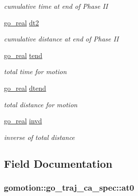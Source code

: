 \begin{DoxyCompactItemize}
\begin{DoxyCompactList}\small\item\em cumulative time at end of Phase I\-I \end{DoxyCompactList}\item 
\hyperlink{gotypes_8h_afd666a2393eebd71ee455846ac9def9b}{go\-\_\-real} \hyperlink{structgomotion_1_1go__traj__ca__spec_a8c0af79f001dc34f84c85968548c3b9b}{dt2}
\begin{DoxyCompactList}\small\item\em cumulative distance at end of Phase I\-I \end{DoxyCompactList}\item 
\hyperlink{gotypes_8h_afd666a2393eebd71ee455846ac9def9b}{go\-\_\-real} \hyperlink{structgomotion_1_1go__traj__ca__spec_abcb5b78e929e0b33d940518032271d04}{tend}
\begin{DoxyCompactList}\small\item\em total time for motion \end{DoxyCompactList}\item 
\hyperlink{gotypes_8h_afd666a2393eebd71ee455846ac9def9b}{go\-\_\-real} \hyperlink{structgomotion_1_1go__traj__ca__spec_abbb8c4d081e5d3a58ec38b69536843c3}{dtend}
\begin{DoxyCompactList}\small\item\em total distance for motion \end{DoxyCompactList}\item 
\hyperlink{gotypes_8h_afd666a2393eebd71ee455846ac9def9b}{go\-\_\-real} \hyperlink{structgomotion_1_1go__traj__ca__spec_acd3e4af0f9f0221e8760864eb89e8730}{invd}
\begin{DoxyCompactList}\small\item\em inverse of total distance \end{DoxyCompactList}\end{DoxyCompactItemize}


\subsection{Field Documentation}
\hypertarget{structgomotion_1_1go__traj__ca__spec_a8f95c4b292ef47cd322a851145e0b3eb}{
\subsubsection[{at0}]{ gomotion\-::go\-\_\-traj\-\_\-ca\-\_\-spec\-::at0}}\label{structgomotion_1_1go__traj__ca__spec_a8f95c4b292ef47cd322a851145e0b3eb}


